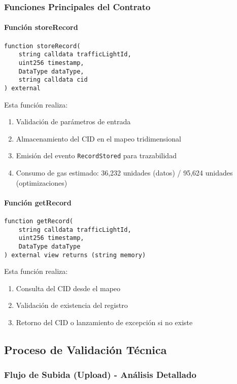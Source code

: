 \documentclass[onecolumn]{article}
\begin{document}
\subsubsection{Funciones Principales del Contrato}

\paragraph{Función storeRecord}
\begin{verbatim}
function storeRecord(
    string calldata trafficLightId,
    uint256 timestamp,
    DataType dataType,
    string calldata cid
) external
\end{verbatim}

Esta función realiza:
\begin{enumerate}
    \item Validación de parámetros de entrada
    \item Almacenamiento del CID en el mapeo tridimensional
    \item Emisión del evento \texttt{RecordStored} para trazabilidad
    \item Consumo de gas estimado: 36,232 unidades (datos) / 95,624 unidades (optimizaciones)
\end{enumerate}

\paragraph{Función getRecord}
\begin{verbatim}
function getRecord(
    string calldata trafficLightId,
    uint256 timestamp,
    DataType dataType
) external view returns (string memory)
\end{verbatim}

Esta función realiza:
\begin{enumerate}
    \item Consulta del CID desde el mapeo
    \item Validación de existencia del registro
    \item Retorno del CID o lanzamiento de excepción si no existe
\end{enumerate}

\subsection{Proceso de Validación Técnica}

\subsubsection{Flujo de Subida (Upload) - Análisis Detallado}
\end{document}
